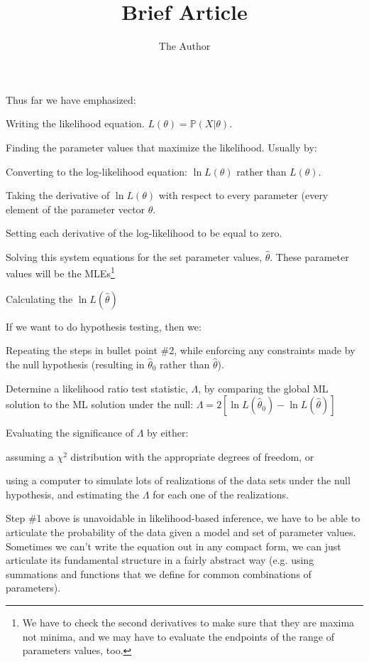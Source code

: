\documentclass[11pt]{article}
\title{Brief Article}
\author{The Author}
\renewcommand{\Pr}{{\mathbb P}}
\begin{document}
Thus far we have emphasized:
\begin{compactenum}
	\item Writing the likelihood equation. $L(\theta) = \Pr(X|\theta)$.
	\item Finding the parameter values that maximize the likelihood. Usually by:
	\begin{compactenum}
		\item Converting to the log-likelihood equation: $\ln L(\theta)$ rather than $L(\theta)$.
		\item Taking the derivative of $\ln L(\theta)$ with respect to every parameter (every element of the parameter vector $\theta$.
		\item Setting each derivative of the log-likelihood to be equal to zero.
		\item Solving this system equations for the set parameter values, $\hat\theta$. These parameter values will be the MLEs\footnote{We have to check the second derivatives to make sure that they are maxima not minima, and we may have to evaluate the endpoints of the range of parameters values, too.}
		\item Calculating the $\ln L(\hat\theta)$
	\end{compactenum}
	\item If we want to do hypothesis testing, then we:
	\begin{compactenum}
		\item Repeating the steps in bullet point \#2, while enforcing any constraints made by the null hypothesis (resulting in $\hat\theta_0$ rather than $\hat\theta$).
		\item Determine a likelihood ratio test statistic, $\Lambda$, by comparing the global ML solution to the ML solution under the null: $\Lambda = 2\left[\ln L(\hat\theta_0)-\ln L(\hat\theta)\right]$
		\item Evaluating the significance of $\Lambda$ by either:
		\begin{compactenum}	
			\item assuming a $\chi^2$ distribution with the appropriate degrees of freedom, or 
			\item using a computer to simulate lots of realizations of the data sets under the null hypothesis, and estimating the $\Lambda$ for each one of the realizations.
		\end{compactenum}
	\end{compactenum}
\end{compactenum}

Step \#1 above is unavoidable in likelihood-based inference, we have to be able to articulate the probability of the data given a model and set of parameter values.
Sometimes we can't write the equation out in any compact form, we can just articulate its fundamental structure in a fairly abstract way (e.g. using summations and functions that we define for common combinations of parameters).
\end{document}
